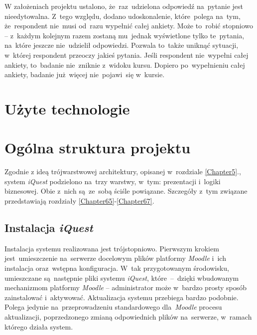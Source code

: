 W założeniach projektu ustalono, że~raz~udzielona odpowiedź na~pytanie jest nieedytowalna. Z~tego względu, dodano udoskonalenie, które~polega na~tym, że~respondent nie~musi od~razu wypełnić całej ankiety. Może to~robić stopniowo -- z~każdym kolejnym razem zostaną mu~jednak wyświetlone tylko te~pytania, na~które jeszcze nie~udzielił odpowiedzi. Pozwala to~także uniknąć sytuacji, w~której respondent przeoczy jakieś pytania. Jeśli respondent nie~wypełni całej ankiety, to~badanie nie~zniknie z~widoku kursu. Dopiero po~wypełnieniu całej ankiety, badanie już~więcej nie~pojawi~się w~kursie.

\section{Użyte technologie}
\label{Chapter63}




\section{Ogólna struktura projektu}
\label{Chapter64}

Zgodnie z ideą trójwarstwowej architektury, opisanej w~rozdziale \ref{Chapter5}., system \textit{iQuest} podzielono na~trzy warstwy, w~tym: prezentacji i~logiki biznesowej. Obie z~nich są~ze~sobą ściśle powiązane. Szczegóły z~tym związane przedstawiają rozdziały \ref{Chapter65}-\ref{Chapter67}.





\subsection{Instalacja \textit{iQuest}}
\label{Chapter68}
Instalacja systemu realizowana jest trójstopniowo. Pierwszym krokiem jest~umieszczenie na~serwerze docelowym plików platformy \textit{Moodle} i~ich instalacja oraz~wstępna konfiguracja. W~tak przygotowanym środowisku, umieszczane są~następnie pliki systemu \textit{iQuest}, które~--~dzięki wbudowanym mechanizmom platformy \textit{Moodle} -- administrator może w~bardzo prosty sposób zainstalować i~aktywować. Aktualizacja systemu przebiega bardzo podobnie. Polega jedynie na~przeprowadzeniu standardowego dla~\textit{Moodle} procesu aktualizacji, poprzedzonego zmianą odpowiednich plików na~serwerze, w~ramach którego działa system.